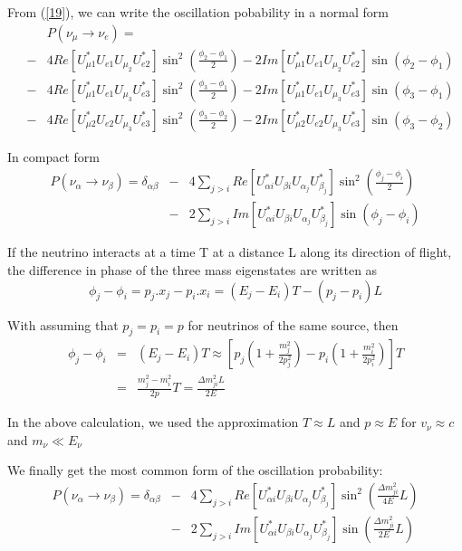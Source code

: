 \documentclass[a4 paper,12pt]{report}%
\begin{document}
From (\ref{19}), we can write the oscillation pobability in a normal form
   \begin{eqnarray}\label{20}
 &&P(\nu_\mu \rightarrow \nu_e) = \nonumber\\
&-& 4Re\left[U^*_{\mu 1}U_{e1}U_{\mu_2}U^*_{e2}\right]\sin^2(\frac{\phi_2-\phi_1}{2})-2Im\left[U^*_{\mu 1}U_{e1}U_{\mu_2}U^*_{e2}\right]\sin(\phi_2-\phi_1) \nonumber\\
&-& 4Re\left[U^*_{\mu 1}U_{e1}U_{\mu_3}U^*_{e3}\right]\sin^2(\frac{\phi_3-\phi_1}{2})-2Im\left[U^*_{\mu 1}U_{e1}U_{\mu_3}U^*_{e3}\right]\sin(\phi_3-\phi_1) \nonumber\\
&-& 4Re\left[U^*_{\mu 2}U_{e2}U_{\mu_3}U^*_{e3}\right]\sin^2(\frac{\phi_3-\phi_2}{2})-2Im\left[U^*_{\mu 2}U_{e2}U_{\mu_3}U^*_{e3}\right]\sin(\phi_3-\phi_2)
   \end{eqnarray} \par
In compact form
   \begin{eqnarray}\label{21}
 P(\nu_\alpha \rightarrow \nu_\beta) =\delta_{\alpha\beta}&-& 4\sum_{j>i}Re\left[U^*_{\alpha i}U_{\beta i}U_{\alpha_j}U^*_{\beta_j}\right]\sin^2(\frac{\phi_j-\phi_i}{2}) \nonumber\\
&-& 2\sum_{j>i}Im\left[U^*_{\alpha i}U_{\beta i}U_{\alpha_j}U^*_{\beta_j}\right]\sin(\phi_j-\phi_i)
   \end{eqnarray} \par


If the neutrino interacts at a time T at a distance L along its direction of flight, the difference in phase of the three mass eigenstates are written as
$$\phi_j-\phi_i =p_j.x_j - p_i.x_i = (E_j-E_i)T-(p_j-p_i)L$$ \par

With assuming that $p_j=p_i = p$ for neutrinos of the same source, then
   \begin{eqnarray}\label{22}
\phi_j-\phi_i& =&(E_j-E_i)T \approx \left[p_j(1+\frac{m_j^2}{2p_j^2}) - p_i(1+\frac{m_i^2}{2p^2_i})\right]T\nonumber\\
&=&\frac{m_j^2-m_i^2}{2p}T = \frac{\Delta m^2_{ji}L}{2E}
   \end{eqnarray} \par
In the above calculation, we used the approximation $T \approx L$ and $p \approx E$ for $v_\nu \approx c $ and $m_\nu \ll E_\nu$

We finally get the most common form of the oscillation probability:
   \begin{eqnarray}\label{23}
 P(\nu_\alpha \rightarrow \nu_\beta) =\delta_{\alpha\beta}&-& 4\sum_{j>i}Re\left[U^*_{\alpha i}U_{\beta i}U_{\alpha_j}U^*_{\beta_j}\right]\sin^2(\frac{\Delta m^2_{ji}}{4E}L) \nonumber\\
&-& 2\sum_{j>i}Im\left[U^*_{\alpha i}U_{\beta i}U_{\alpha_j}U^*_{\beta_j}\right]\sin(\frac{\Delta m^2_{ji}}{2E}L)
   \end{eqnarray} \par
\end{document}
